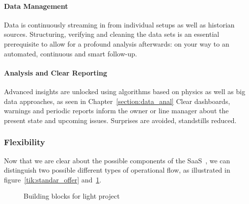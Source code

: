 \paragraph{Data Management}
Data is continuously streaming in from individual setups as well as historian sources.
Structuring, verifying and cleaning the data sets is an essential prerequisite to allow for a profound analysis afterwards: on your way to an automated, continuous and smart follow-up.

\paragraph{Analysis and Clear Reporting}
Advanced insights are unlocked using algorithms based on physics as well as big data approaches, as seen in Chapter~\ref{section:data_anal}
Clear dashboards, warnings and periodic reports inform the owner or line manager about the present state and upcoming issues. Surprises are avoided, standstills reduced.

\subsubsection{Flexibility}
Now that we are clear about the possible components of the \ac{SaaS}~\cite{Article:matthewlemerle_2012_its}, we can distinguish two possible different types of operational flow, as illustrated in figure~\ref{tik:standar_offer} and~\ref{tik:ligth_offer}.
\begin{figure}[ht]
	\caption{Building blocks for light project}
	\label{tik:ligth_offer}
\end{figure}

